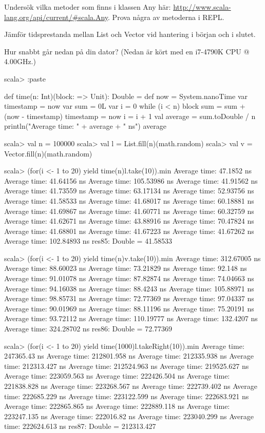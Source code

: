 \AdvancedTasks %

\Task Undersök vilka metoder som finns i klassen Any här: \href{http://www.scala-lang.org/api/current/\#scala.Any}{http://www.scala-lang.org/api/current/\#scala.Any}. Prova några av metoderna i REPL.

\Task Jämför tidsprestanda mellan List och Vector vid hantering i början och i slutet. 

\Subtask Hur snabbt går nedan på din dator? (Nedan är kört med en i7-4790K CPU @ 4.00GHz.) %

\begin{REPLnonum}
scala> :paste

def time(n: Int)(block: => Unit): Double =  {
  def now = System.nanoTime
  var timestamp = now
  var sum = 0L
  var i = 0
  while (i < n) {
    block
    sum = sum + (now - timestamp)
    timestamp = now
    i = i + 1
  }
  val average = sum.toDouble / n
  println("Average time: " + average + " ns")
  average
}

scala> val n = 100000
scala> val l = List.fill(n)(math.random)
scala> val v = Vector.fill(n)(math.random)

scala> (for(i <- 1 to 20) yield time(n){l.take(10)}).min
Average time: 47.1852 ns
Average time: 41.64156 ns
Average time: 105.53986 ns
Average time: 41.91562 ns
Average time: 41.73559 ns
Average time: 63.17134 ns
Average time: 52.93756 ns
Average time: 41.58533 ns
Average time: 41.68017 ns
Average time: 60.18881 ns
Average time: 41.69867 ns
Average time: 41.60771 ns
Average time: 60.32759 ns
Average time: 41.62671 ns
Average time: 43.88916 ns
Average time: 70.47824 ns
Average time: 41.68801 ns
Average time: 41.67223 ns
Average time: 41.67262 ns
Average time: 102.84893 ns
res85: Double = 41.58533

scala> (for(i <- 1 to 20) yield time(n){v.take(10)}).min
Average time: 312.67005 ns
Average time: 88.60023 ns
Average time: 73.21829 ns
Average time: 92.148 ns
Average time: 91.01078 ns
Average time: 87.82874 ns
Average time: 74.04663 ns
Average time: 94.16038 ns
Average time: 88.4243 ns
Average time: 105.88971 ns
Average time: 98.85731 ns
Average time: 72.77369 ns
Average time: 97.04337 ns
Average time: 90.01969 ns
Average time: 88.11196 ns
Average time: 75.20191 ns
Average time: 93.72112 ns
Average time: 110.19777 ns
Average time: 132.4207 ns
Average time: 324.28702 ns
res86: Double = 72.77369

scala> (for(i <- 1 to 20) yield time(1000){l.takeRight(10)}).min
Average time: 247365.43 ns
Average time: 212801.958 ns
Average time: 212335.938 ns
Average time: 212313.427 ns
Average time: 212524.963 ns
Average time: 219525.627 ns
Average time: 223059.563 ns
Average time: 222426.504 ns
Average time: 221838.828 ns
Average time: 223268.567 ns
Average time: 222739.402 ns
Average time: 222685.229 ns
Average time: 223122.599 ns
Average time: 222683.921 ns
Average time: 222865.865 ns
Average time: 222889.118 ns
Average time: 223247.135 ns
Average time: 222016.82 ns
Average time: 223040.299 ns
Average time: 222624.613 ns
res87: Double = 212313.427


\end{REPLnonum}
